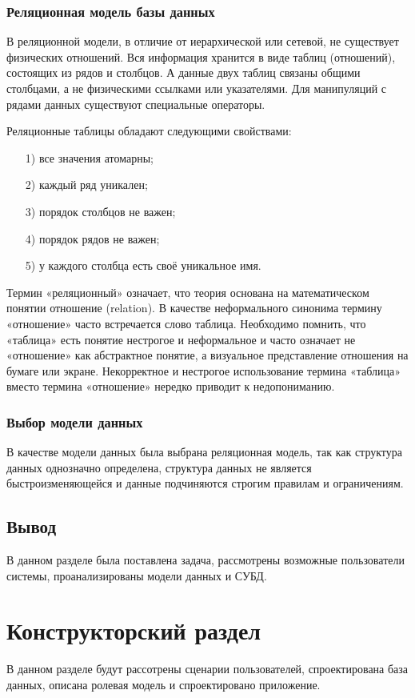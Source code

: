 \subsubsection{Реляционная модель базы данных}
В реляционной модели, в отличие от иерархической или сетевой, не существует физических отношений. Вся информация хранится в виде таблиц (отношений), состоящих из рядов и столбцов. А данные двух таблиц связаны общими столбцами, а не физическими ссылками или указателями. Для манипуляций с рядами данных существуют специальные операторы.

Реляционные таблицы обладают следующими свойствами:
\begin{itemize}
	\item[1)] все значения атомарны;
	\item[2)] каждый ряд уникален;
	\item[3)] порядок столбцов не важен;
	\item[4)] порядок рядов не важен;
	\item[5)] у каждого столбца есть своё уникальное имя.
\end{itemize}

Термин «реляционный» означает, что теория основана на математическом понятии отношение (relation). В качестве неформального синонима термину «отношение» часто встречается слово таблица. Необходимо помнить, что «таблица» есть понятие нестрогое и неформальное и часто означает не «отношение» как абстрактное понятие, а визуальное представление отношения на бумаге или экране. Некорректное и нестрогое использование термина «таблица» вместо термина «отношение» нередко приводит к недопониманию.

\subsubsection{Выбор модели данных}
В качестве модели данных была выбрана реляционная модель, так как структура данных однозначно определена, структура данных не является быстроизменяющейся и данные подчиняются строгим правилам и ограничениям.

\subsection{Вывод}
В данном разделе была поставлена задача, рассмотрены возможные пользователи системы, проанализированы модели данных и СУБД.


\clearpage
\section{Конструкторский раздел}
В данном разделе будут рассотрены сценарии пользователей, спроектирована база данных, описана ролевая модель и спроектировано приложение.
